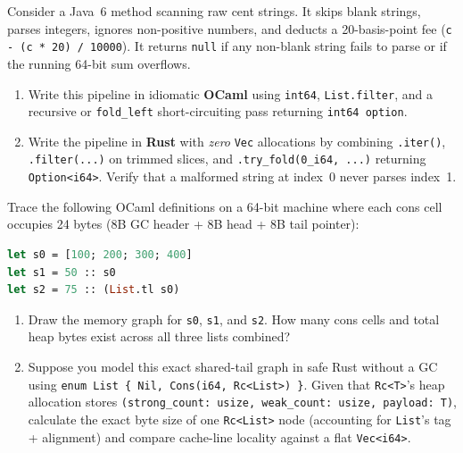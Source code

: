 \begin{exercise}
Consider a Java~6 method scanning raw cent strings. It skips blank strings, parses integers, ignores non-positive numbers, and deducts a 20-basis-point fee (\texttt{c - (c * 20) / 10000}). It returns \texttt{null} if any non-blank string fails to parse or if the running 64-bit sum overflows.
\begin{enumerate}
  \item Write this pipeline in idiomatic \textbf{OCaml} using \texttt{int64},
    \texttt{List.filter}, and a recursive or \texttt{fold\_left} short-circuiting pass
    returning \texttt{int64 option}.
  \item Write the pipeline in \textbf{Rust} with \emph{zero} \texttt{Vec} allocations
    by combining \texttt{.iter()}, \texttt{.filter(...)} on trimmed slices, and
    \texttt{.try\_fold(0\_i64, ...)} returning \texttt{Option<i64>}. Verify that a
    malformed string at index~0 never parses index~1.
\end{enumerate}
\end{exercise}

\begin{exercise}
Trace the following OCaml definitions on a 64-bit machine where each cons cell
occupies 24 bytes (8B GC header + 8B head + 8B tail pointer):
\begin{lstlisting}[language=OCaml]
let s0 = [100; 200; 300; 400]
let s1 = 50 :: s0
let s2 = 75 :: (List.tl s0)
\end{lstlisting}
\begin{enumerate}
  \item Draw the memory graph for \texttt{s0}, \texttt{s1}, and \texttt{s2}. How many
    cons cells and total heap bytes exist across all three lists combined?
  \item Suppose you model this exact shared-tail graph in safe Rust without a GC using
    \texttt{enum List \{ Nil, Cons(i64, Rc<List>) \}}. Given that \texttt{Rc<T>}'s
    heap allocation stores \texttt{(strong\_count: usize, weak\_count: usize, payload: T)},
    calculate the exact byte size of one \texttt{Rc<List>} node (accounting for
    \texttt{List}'s tag + alignment) and compare cache-line locality against a flat
    \texttt{Vec<i64>}.
\end{enumerate}
\end{exercise}

